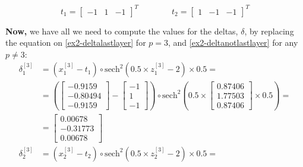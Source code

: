 \documentclass[12pt]{article}
\begin{document}
\begin{enumerate}[leftmargin=\labelsep]
        \begin{equation*}
          t_1 = \begin{bmatrix} -1 & 1 & -1\end{bmatrix}^T \qquad\qquad
          t_2 = \begin{bmatrix} 1 & -1 & -1\end{bmatrix}^T
        \end{equation*}

        \textbf{Now,} we have all we need to compute the values for the deltas, $\delta$, by replacing the equation on \eqref{ex2-deltalastlayer} for $p=3$,
        and \eqref{ex2-deltanotlastlayer} for any $p \neq 3$:
        \begingroup
        \allowdisplaybreaks
        \begin{align*}
          \delta^{[3]}_1 & = \left(x^{[3]}_1 - t_1\right) \circ  \text{sech}^{2}\left(0.5\times z^{[3]}_1 - 2\right) \times 0.5 =                                                                                                                                        \\
                         & =  \left(\begin{bmatrix} -0.9159 \\ -0.80494 \\ -0.9159\end{bmatrix} - \begin{bmatrix} -1 \\ 1 \\ -1 \end{bmatrix}\right) \circ \text{sech}^{2}\left(0.5\times \begin{bmatrix} 0.87406 \\ 1.77503 \\ 0.87406\end{bmatrix} \times 0.5\right) = \\
                         & = \begin{bmatrix} 0.00678 \\ -0.31773 \\ 0.00678 \end{bmatrix}                                                                                                                                                                                \\
          \delta^{[3]}_2 & = \left(x^{[3]}_2 - t_2\right) \circ  \text{sech}^{2}\left(0.5\times z^{[3]}_2 - 2\right) \times 0.5 =                                                                                                                                        \\

\end{align*}
\end{enumerate}
\end{document}
